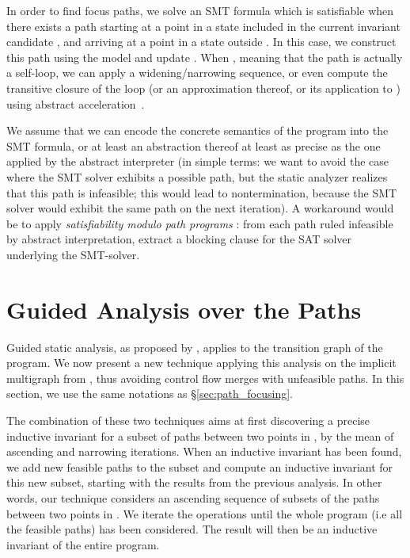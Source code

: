 In order to find focus paths, we solve an SMT formula which is satisfiable when
there exists a path starting at a point  in a state included in the
current invariant candidate , and arriving at a point  in a
state outside . In this case, we construct this path using the model and
update . When , meaning that the path is actually a self-loop,
we can apply a widening/narrowing sequence, or even compute the transitive
closure of the loop (or an approximation thereof, or its application to )
using abstract acceleration~\cite{DBLP:conf/sas/GonnordH06}.

We assume that we can encode the concrete semantics of the program into the SMT formula, or at least an abstraction thereof at least as precise as the one applied by the abstract interpreter (in simple terms: we want to avoid the case where the SMT solver exhibits a possible path, but the static analyzer realizes that this path is infeasible; this would lead to nontermination, because the SMT solver would exhibit the same path on the next iteration).
A workaround would be to apply \emph{satisfiability modulo path programs} \cite{DBLP:conf/popl/HarrisSIG10}: from each path ruled infeasible by abstract interpretation, extract a blocking clause for the SAT solver underlying the SMT-solver.

\section{Guided Analysis over the Paths}
\label{sec:guided_multigraph}

Guided static analysis, as proposed by \cite{DBLP:conf/sas/GopanR07}, applies to the transition
graph of the program. We now present a new technique applying this analysis on the implicit
multigraph from \cite{Monniaux_Gonnord_SAS11}, thus avoiding control flow merges with
unfeasible paths.
In this section, we use the same notations as \S\ref{sec:path_focusing}.


The combination of these two techniques aims at first discovering a precise
inductive invariant for a subset of paths between two points in , 
by the mean of ascending and narrowing iterations. When an
inductive invariant has been found, we add new feasible paths to the subset and
compute an inductive invariant for this new subset, starting with the results
from the previous analysis.
In other words, our technique considers an ascending sequence of
subsets of the paths between two points in .
We iterate the operations until the whole program (i.e all the
feasible paths) has been considered. The result will then be an
inductive invariant of the entire program.

